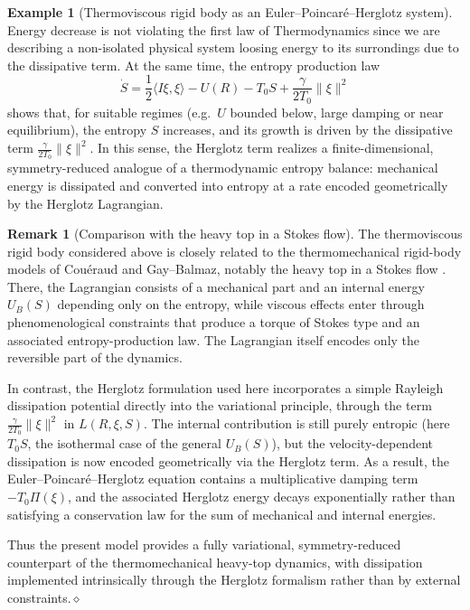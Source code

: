 \documentclass[11pt,a4paper]{article}
\theoremstyle{definition}
\newtheorem{remark}[theorem]{Remark}
\newtheorem{example}[theorem]{Example}
\begin{document}
\begin{example}[Thermoviscous rigid body as an Euler--Poincar\'e--Herglotz system]
Energy decrease is not violating the first law of Thermodynamics since we are describing a non-isolated physical system loosing energy to its surrondings due to the dissipative term. At the same time, the entropy production law
\[
\dot S
= \frac{1}{2}\langle I\xi,\xi\rangle
  - U(R) - T_0 S
  + \frac{\gamma}{2T_0}\lVert\xi\rVert^2
\]
shows that, for suitable regimes (e.g.\ $U$ bounded below, large damping
or near equilibrium), the entropy $S$ increases, and its growth is
driven by the dissipative term $\frac{\gamma}{2T_0}\|\xi\|^2$.
In this sense, the Herglotz term realizes a finite-dimensional,
symmetry-reduced analogue of a thermodynamic entropy balance:
mechanical energy is dissipated and converted into entropy at a rate
encoded geometrically by the Herglotz Lagrangian.

\end{example}


\begin{remark}[Comparison with the heavy top in a Stokes flow]
The thermoviscous rigid body considered above is closely related to the
thermomechanical rigid-body models of Couéraud and Gay--Balmaz,
notably the heavy top in a Stokes flow \cite{CoueraudGayBalmaz2020}.
There, the Lagrangian consists of a mechanical part and an internal
energy $U_B(S)$ depending only on the entropy, while viscous effects
enter through phenomenological constraints that produce a torque of
Stokes type and an associated entropy-production law. The Lagrangian
itself encodes only the reversible part of the dynamics.

In contrast, the Herglotz formulation used here incorporates a simple
Rayleigh dissipation potential directly into the variational principle,
through the term $\tfrac{\gamma}{2T_0}\|\xi\|^2$ in $L(R,\xi,S)$.  The
internal contribution is still purely entropic (here $T_0S$, the
isothermal case of the general $U_B(S)$), but the velocity-dependent
dissipation is now encoded geometrically via the Herglotz term.  As a
result, the Euler--Poincaré--Herglotz equation contains a multiplicative
damping term $-T_0\Pi(\xi)$, and the associated Herglotz energy decays
exponentially rather than satisfying a conservation law for the sum of
mechanical and internal energies.

Thus the present model provides a fully variational, symmetry-reduced
counterpart of the thermomechanical heavy-top dynamics, with dissipation
implemented intrinsically through the Herglotz formalism rather than by
external constraints.\hfill$\diamond$
\end{remark}
\end{document}
